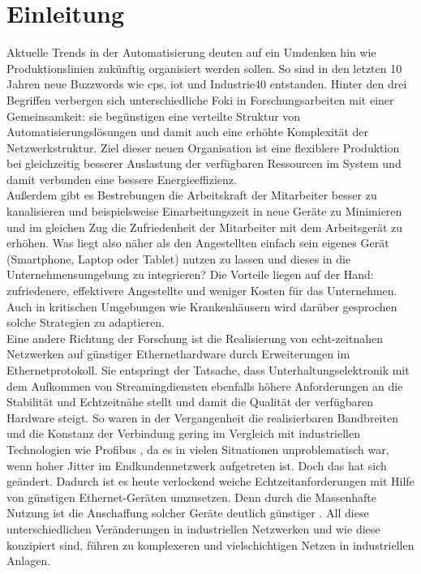 \chapter{Einleitung}
Aktuelle Trends in der Automatisierung deuten auf ein Umdenken hin wie Produktionslinien zukünftig organisiert werden sollen. So sind in den letzten 10 Jahren neue Buzzwords wie \acrfull{cps}, \acrfull{iot} und \Gls{Industrie40} entstanden. Hinter den drei Begriffen verbergen sich unterschiedliche Foki in Forschungsarbeiten mit einer Gemeinsamkeit: sie begünstigen eine verteilte Struktur von Automatisierungslösungen und damit auch eine erhöhte Komplexität der Netzwerkstruktur. Ziel dieser neuen Organisation ist eine flexiblere Produktion bei gleichzeitig besserer Auslastung der verfügbaren Ressourcen im System und damit verbunden eine bessere Energieeffizienz.\cite{wollschlaeger2017future} \\
Außerdem gibt es Bestrebungen die Arbeitskraft der Mitarbeiter besser zu kanalisieren und beispielsweise Einarbeitungszeit in neue Geräte zu Minimieren und im gleichen Zug die Zufriedenheit der Mitarbeiter mit dem Arbeitsgerät zu erhöhen. Was liegt also näher als den Angestellten einfach sein eigenes Gerät (Smartphone, Laptop oder Tablet) nutzen zu lassen und dieses in die Unternehmensumgebung zu integrieren? Die Vorteile liegen auf der Hand: zufriedenere, effektivere Angestellte und weniger Kosten für das Unternehmen. Auch in kritischen Umgebungen wie Krankenhäusern wird darüber gesprochen solche Strategien zu adaptieren. \cite{wani2020hospital, french2014current} \\
Eine andere Richtung der Forschung ist die Realisierung von echt-zeitnahen Netzwerken auf günstiger Ethernethardware durch Erweiterungen im Ethernetprotokoll. Sie entspringt der Tatsache, dass Unterhaltungselektronik mit dem Aufkommen von Streamingdiensten ebenfalls höhere Anforderungen an die Stabilität und Echtzeitnähe stellt\cite{wollschlaeger2017future} und damit die Qualität der verfügbaren Hardware steigt. So waren in der Vergangenheit die realisierbaren Bandbreiten und die Konstanz der Verbindung gering im Vergleich mit industriellen Technologien wie Profibus \cite{tovar1999real}, da es in vielen Situationen unproblematisch war, wenn hoher \Gls{Jitter} im Endkundennetzwerk aufgetreten ist. Doch das hat sich geändert. Dadurch ist es heute verlockend weiche Echtzeitanforderungen mit Hilfe von günstigen Ethernet-Geräten umzusetzen. Denn durch die Massenhafte Nutzung ist die Anschaffung solcher Geräte deutlich günstiger \cite{enduserSwitch, profinetSwitch}. All diese unterschiedlichen Veränderungen in industriellen Netzwerken und wie diese konzipiert sind, führen zu komplexeren und vielschichtigen Netzen in industriellen Anlagen. \\
